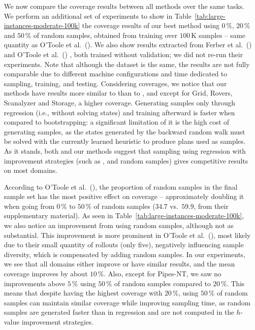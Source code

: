 We now compare the coverage results between all methods over the same tasks. We perform an additional set of experiments to show in Table~\ref{tab:large-instances-moderate-100k} the coverage results of our best method using $0\,\%$, $20\,\%$ and $50\,\%$ of random samples, obtained from training over $100$\,K samples -- same quantity as O'Toole et al.~(\citeyear{OToole/2022}). We also show results extracted from Ferber et al.~(\citeyear{Ferber.etal/2022}) \hboot and O'Toole et al.~(\citeyear{OToole/2022}) \hnrsl, both trained without validation; we did not re-run their experiments. Note that although the dataset is the same, the results are not fully comparable due to different machine configurations and time dedicated to sampling, training, and testing. Considering coverages, we notice that our methods have results more similar to \hnrsl than to \hboot, and except for Grid, Rovers, Scanalyzer and Storage, a higher coverage. Generating samples only through regression (i.e., without solving states) and training afterward is faster when compared to bootstrapping: a significant limitation of it is the high cost of generating samples, as the states generated by the backward random walk must be solved with the currently learned heuristic to produce plans used as samples.
As it stands, both \hnrsl and our methods suggest that sampling using regression with improvement strategies (such as \hmin, \hvfc and random samples) gives competitive results on most domains.



According to O'Toole et al.~(\citeyear{OToole/2022}), the proportion of random samples in the final sample set has the most positive effect on coverage -- approximately doubling it when going from $0\,\%$ to $50\,\%$ of random samples ($34.7$ vs.~$59.9$, from their supplementary material). As seen in Table~\ref{tab:large-instances-moderate-100k}, we also notice an improvement from using random samples, although not as substantial. This improvement is more prominent in O'Toole et al.~(\citeyear{OToole/2022}), most likely due to their small quantity of rollouts (only five), negatively influencing sample diversity, which is compensated by adding random samples. In our experiments, we see that all domains either improve or have similar results, and the mean coverage improves by about $10\,\%$. Also, except for Pipes-NT, we saw no improvements above $5\,\%$ using $50\,\%$ of random samples compared to $20\,\%$. This means that despite having the highest coverage with $20\,\%$, using $50\,\%$ of random samples can maintain similar coverage while improving sampling time, as random samples are generated faster than in regression and are not computed in the $h$-value improvement strategies.
